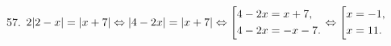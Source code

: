 57. $2|2-x|=|x+7|\Leftrightarrow|4-2x|=|x+7|\Leftrightarrow\left[\begin{gathered}
     4-2x=x+7,\hfill\\
     4-2x=-x-7.\hfill \end{gathered}\right.\Leftrightarrow\left[\begin{gathered}
     x=-1,\hfill\\
     x=11.\hfill \end{gathered}\right.$\\
